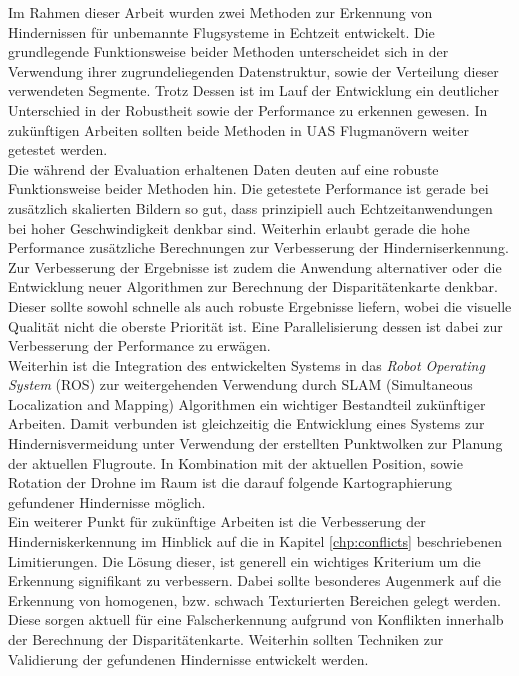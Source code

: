 Im Rahmen dieser Arbeit wurden zwei Methoden zur Erkennung von Hindernissen für unbemannte Flugsysteme in Echtzeit entwickelt. Die grundlegende Funktionsweise beider Methoden unterscheidet sich in der Verwendung ihrer zugrundeliegenden Datenstruktur, sowie der Verteilung dieser verwendeten Segmente. Trotz Dessen ist im Lauf der Entwicklung ein deutlicher Unterschied in der Robustheit sowie der Performance zu erkennen gewesen. In zukünftigen Arbeiten sollten beide Methoden in UAS Flugmanövern weiter getestet werden.\\

\noindent
Die während der Evaluation erhaltenen Daten deuten auf eine robuste Funktionsweise beider Methoden hin. Die getestete Performance ist gerade bei zusätzlich skalierten Bildern so gut, dass prinzipiell auch Echtzeitanwendungen bei hoher Geschwindigkeit denkbar sind. Weiterhin erlaubt gerade die hohe Performance zusätzliche Berechnungen zur Verbesserung der Hinderniserkennung.\\

\noindent
Zur Verbesserung der Ergebnisse ist zudem die Anwendung alternativer oder die Entwicklung neuer Algorithmen zur Berechnung der Disparitätenkarte denkbar. Dieser sollte sowohl schnelle als auch robuste Ergebnisse liefern, wobei die visuelle Qualität nicht die oberste Priorität ist. Eine Parallelisierung dessen ist dabei zur Verbesserung der Performance zu erwägen.\\

\noindent
Weiterhin ist die Integration des entwickelten Systems in das \emph{Robot Operating System} (ROS) zur weitergehenden Verwendung durch SLAM (Simultaneous Localization and Mapping) Algorithmen ein wichtiger Bestandteil zukünftiger Arbeiten. Damit verbunden ist gleichzeitig die Entwicklung eines Systems zur Hindernisvermeidung unter Verwendung der erstellten Punktwolken zur Planung der aktuellen Flugroute. In Kombination mit der aktuellen Position, sowie Rotation der Drohne im Raum ist die darauf folgende Kartographierung gefundener Hindernisse möglich.\\

\noindent
Ein weiterer Punkt für zukünftige Arbeiten ist die Verbesserung der Hinderniskerkennung im Hinblick auf die in Kapitel \ref{chp:conflicts} beschriebenen Limitierungen. Die Lösung dieser, ist generell ein wichtiges Kriterium um die Erkennung signifikant zu verbessern. Dabei sollte besonderes Augenmerk auf die Erkennung von homogenen, bzw. schwach Texturierten Bereichen gelegt werden. Diese sorgen aktuell für eine Falscherkennung aufgrund von Konflikten innerhalb der Berechnung der Disparitätenkarte. Weiterhin sollten Techniken zur Validierung der gefundenen Hindernisse entwickelt werden.